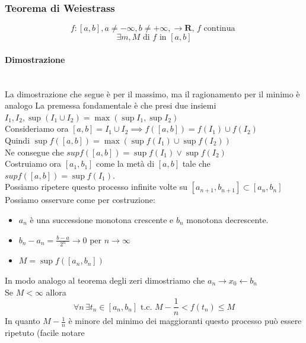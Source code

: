 \documentclass{report}
\newcommand{\subsubsubsection}[1]{\paragraph{#1}\mbox{}\\}
\begin{document}
        \subsubsection{Teorema di Weiestrass}
            $$f: \left[a, b\right], a \neq -\infty, b \neq +\infty, \longrightarrow \mathbf{R}, \, f \textrm{ continua }$$
            $$\exists m, M \textrm{ di } f \textrm{ in } \left[a, b\right]$$
            \subsubsubsection{Dimostrazione}
                La dimostrazione che segue è per il massimo, ma il ragionamento per il minimo è analogo
                La premessa fondamentale è che presi due insiemi $I_1, I_2, \sup\left(I_1 \cup I_2\right) = \max\left(\sup I_1, \sup I_2\right)$ \\
                Consideriamo ora $\left[a, b\right] = I_1 \cup I_2 \implies f\left(\left[a, b\right]\right) = f\left(I_1\right) \cup f\left(I_2\right)$ \\
                Quindi $\sup f\left(\left[a, b\right]\right) = \max\left(\sup f\left(I_1\right) \cup \sup f\left(I_2\right)\right)$ \\
                Ne consegue che $sup f\left(\left[a, b\right]\right) = \sup f\left(I_1\right) \lor \sup f\left(I_2\right)$ \\
                Costruiamo ora $\left[a_1, b_1\right]$ come la metà di $\left[a, b\right]$ tale che $sup f\left(\left[a, b\right]\right) = \sup f\left(I_1\right)$. \\
                Possiamo ripetere questo processo infinite volte su $\left[a_{n+1}, b_{n+1}\right] \subset \left[a_n, b_n\right]$ \\
                Possiamo osservare come per costruzione:
                    \begin{itemize}
                        \item $a_n$ è una successione monotona crescente e $b_n$ monotona decrescente. 
                        \item $b_n - a_n = \frac{b - a}{2^n} \rightarrow 0$ per $n \rightarrow \infty$
                        \item $M = \sup f\left(\left[a_n, b_n\right]\right)$
                    \end{itemize}
                In modo analogo al teorema degli zeri dimostriamo che $a_n \rightarrow x_0 \leftarrow b_n$ \\
                Se $M < \infty$ allora 
                $$\forall n \, \exists t_n \in \left[a_n, b_n\right] \textrm{ t.c. } M - \frac{1}{n} < f\left(t_n\right) \leq M$$
                In quanto $M - \frac{1}{n}$ è minore del minimo dei maggioranti questo processo può essere ripetuto (facile notare 
\end{document}
